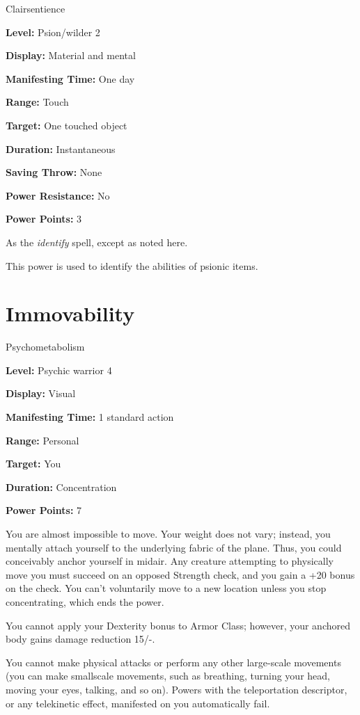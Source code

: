 \documentclass{article}
\begin{document}
Clairsentience

\textbf{Level:} Psion/wilder 2

\textbf{Display:} Material and mental

\textbf{Manifesting Time:} One day

\textbf{Range:} Touch

\textbf{Target:} One touched object

\textbf{Duration:} Instantaneous

\textbf{Saving Throw:} None

\textbf{Power Resistance:} No

\textbf{Power Points:} 3

As the \textit{identify }spell, except as noted here. 

This power is used to identify the abilities of psionic items.

\vspace{12pt}
\section*{Immovability}

Psychometabolism

\textbf{Level:} Psychic warrior 4

\textbf{Display:} Visual

\textbf{Manifesting Time:} 1 standard action

\textbf{Range:} Personal

\textbf{Target:} You

\textbf{Duration:} Concentration

\textbf{Power Points:} 7

You are almost impossible to move. Your weight does not vary; instead, you mentally 
attach yourself to the underlying fabric of the plane. Thus, you could conceivably 
anchor yourself in midair. Any creature attempting to physically move you must 
succeed on an opposed Strength check, and you gain a +20 bonus on the check. You 
can't voluntarily move to a new location unless you stop concentrating, which ends 
the power.

You cannot apply your Dexterity bonus to Armor Class; however, your anchored body 
gains damage reduction 15/-.

You cannot make physical attacks or perform any other large-scale movements (you 
can make smallscale movements, such as breathing, turning your head, moving your 
eyes, talking, and so on). Powers with the teleportation descriptor, or any telekinetic 
effect, manifested on you automatically fail.
\end{document}
